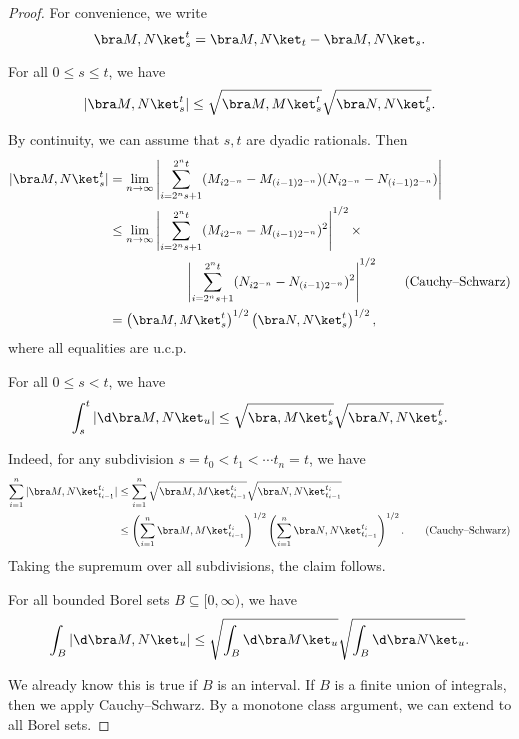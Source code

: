 \documentclass[a4paper]{article}
\begin{document}
\begin{proof}
  For convenience, we write
  \[
    \bra M, N\ket_s^t = \bra M, N\ket_t - \bra M, N\ket_s.
  \]
  \begin{claim}
    For all $0 \leq s \leq t$, we have
    \[
      |\bra M, N\ket_s^t| \leq \sqrt{\bra M, M\ket_s^t} \sqrt{\bra N, N\ket_s^t}.
    \]
  \end{claim}
  By continuity, we can assume that $s, t$ are dyadic rationals. Then
  \begin{align*}
    |\bra M, N\ket_s^t| &= \lim_{n \to \infty} \left| \sum_{i = 2^ns + 1}^{2^n t} (M_{i 2^{-n}} - M_{(i - 1)2^{-n}})(N_{i 2^{-n}} -N_{(i - 1)2^{-n}})\right|\\
    &\leq \lim_{n \to \infty} \left| \sum_{i = 2^ns + 1}^{2^n t} (M_{i 2^{-n}} - M_{(i - 1)2^{-n}})^2\right|^{1/2}\times\\
    &\hphantom{aaaaaaaaaaa}\left| \sum_{i = 2^n s + 1}^{2^n t} (N_{i 2^{-n}} - N_{(i - 1)2^{-n}})^2\right|^{1/2}\tag{Cauchy--Schwarz}\\
    &= \left(\bra M, M\ket_s^t \right)^{1/2}\left(\bra N, N\ket_s^t\right)^{1/2},
  \end{align*}
  where all equalities are u.c.p.

  \begin{claim}
    For all $0 \leq s < t$, we have
    \[
      \int_s^t |\d \bra M, N\ket_u| \leq \sqrt{\bra , M\ket_s^t}\sqrt{\bra N, N\ket_s^t}.
    \]
  \end{claim}
  Indeed, for any subdivision $s = t_0 < t_1 < \cdots t_n = t$, we have
  \begin{align*}
    \sum_{i = 1}^n |\bra M, N\ket_{t_{i - 1}}^{t_i}| &\leq \sum_{i = 1}^n \sqrt{\bra M, M\ket_{t_{i - 1}}^{t_i}} \sqrt{\bra N, N\ket_{t_{i - 1}}^{t_i}}\\
    &\leq \left(\sum_{i = 1}^n \bra M, M\ket_{t_{i - 1}}^{t_i}\right)^{1/2} \left(\sum_{i = 1}^n \bra N, N\ket_{t_{i - 1}}^{t_i}\right)^{1/2}. \tag{Cauchy--Schwarz}
  \end{align*}
  Taking the supremum over all subdivisions, the claim follows.

  \begin{claim}
    For all bounded Borel sets $B \subseteq [0, \infty)$, we have
    \[
      \int_B |\d \bra M, N\ket_u| \leq \sqrt{\int_B \d \bra M\ket_u} \sqrt{\int_B \d \bra N\ket_u}.
    \]
  \end{claim}
  We already know this is true if $B$ is an interval. If $B$ is a finite union of integrals, then we apply Cauchy--Schwarz. By a monotone class argument, we can extend to all Borel sets.


\end{proof}
\end{document}

